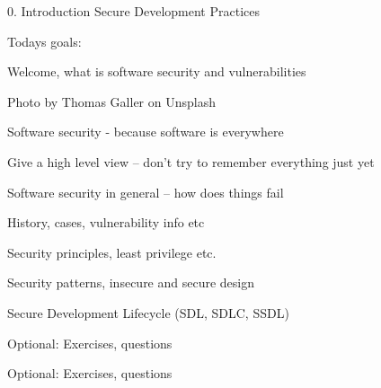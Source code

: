 \documentclass[Screen16to9,17pt]{foils}
\begin{document}
\mytitlepage
{0. Introduction}
{Secure Development Practices}

\hlkprofiluk



Todays goals:
\begin{list2}
\item Welcome, what is software security and vulnerabilities
\item
\item
\item
\item
\end{list2}

  Photo by Thomas Galler on Unsplash



\begin{list1}
\item Software security - because software is everywhere
\item Give a high level view -- don't try to remember everything just yet
\end{list1}




\begin{list2}
\item Software security in general -- how does things fail
\item History, cases, vulnerability info etc
\item Security principles, least privilege etc.
\item Security patterns, insecure and secure design
\item Secure Development Lifecycle (SDL, SDLC, SSDL)
\item
\item Optional: Exercises, questions
\end{list2}


\begin{list2}
\item
\item
\item
\item
\item
\item
\item Optional: Exercises, questions
\end{list2}
\end{document}
